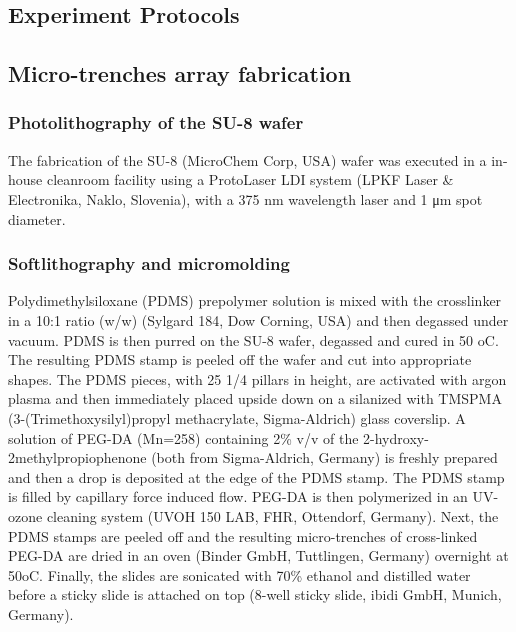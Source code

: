 \documentclass[pdftex,12pt,a4paper]{report}
\begin{document}
\begin{appendices}

\chapter{Experiment Protocols}

\section{Micro-trenches array fabrication}
\label{appendix:microtrench}

\subsection*{Photolithography of the SU-8 wafer}

The fabrication of the SU-8 (MicroChem Corp, USA) wafer was executed in a in-house cleanroom facility using a ProtoLaser LDI system (LPKF Laser \& Electronika, Naklo, Slovenia), with a 375 nm wavelength laser and 1 μm spot diameter.

\subsection*{Softlithography and micromolding}

Polydimethylsiloxane (PDMS) prepolymer solution is mixed with the crosslinker in a 10:1 ratio (w/w) (Sylgard 184, Dow Corning, USA) and then degassed under vacuum. PDMS is then purred on the SU-8 wafer, degassed and cured in 50 oC. The resulting PDMS stamp is peeled off the wafer and cut into appropriate shapes. The PDMS pieces, with 25 1/4 pillars in height, are activated with argon plasma and then immediately placed upside down on a silanized with TMSPMA (3-(Trimethoxysilyl)propyl methacrylate, Sigma-Aldrich) glass coverslip. A solution of PEG-DA (Mn=258) containing 2\% v/v of the 2-hydroxy-2methylpropiophenone (both from Sigma-Aldrich, Germany) is freshly prepared and then a drop is deposited at the edge of the PDMS stamp. The PDMS stamp is filled by capillary force induced flow. PEG-DA is then polymerized in an UV-ozone cleaning system (UVOH 150 LAB, FHR, Ottendorf, Germany). Next, the PDMS stamps are peeled off and the resulting micro-trenches of cross-linked PEG-DA are dried in an oven (Binder GmbH, Tuttlingen, Germany) overnight at 50oC. Finally, the slides are sonicated with 70\% ethanol and distilled water before a sticky slide is attached on top (8-well sticky slide, ibidi GmbH, Munich, Germany).


\end{appendices}
\end{document}
